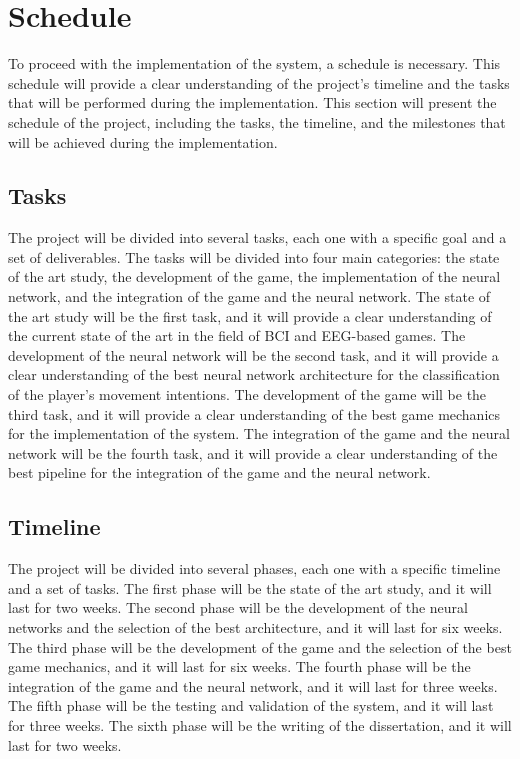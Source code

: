 \chapter{Schedule}\label{ch:schedule}
To proceed with the implementation of the system, a schedule is necessary.
This schedule will provide a clear understanding of the project's timeline and the tasks that will be performed during the implementation.
This section will present the schedule of the project, including the tasks, the timeline, and the milestones that will be achieved during the implementation.

\section{Tasks}
The project will be divided into several tasks, each one with a specific goal and a set of deliverables.
The tasks will be divided into four main categories: the state of the art study, the development of the game, the implementation of the neural network, and the integration of the game and the neural network.
The state of the art study will be the first task, and it will provide a clear understanding of the current state of the art in the field of BCI and EEG-based games.
The development of the neural network will be the second task, and it will provide a clear understanding of the best neural network architecture for the classification of the player's movement intentions.
The development of the game will be the third task, and it will provide a clear understanding of the best game mechanics for the implementation of the system.
The integration of the game and the neural network will be the fourth task, and it will provide a clear understanding of the best pipeline for the integration of the game and the neural network.

\section{Timeline}
The project will be divided into several phases, each one with a specific timeline and a set of tasks.
The first phase will be the state of the art study, and it will last for two weeks.
The second phase will be the development of the neural networks and the selection of the best architecture, and it will last for six weeks.
The third phase will be the development of the game and the selection of the best game mechanics, and it will last for six weeks.
The fourth phase will be the integration of the game and the neural network, and it will last for three weeks.
The fifth phase will be the testing and validation of the system, and it will last for three weeks.
The sixth phase will be the writing of the dissertation, and it will last for two weeks.

